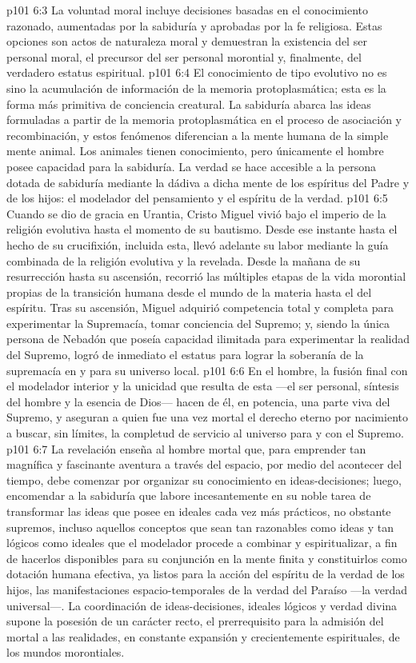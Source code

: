 \vs p101 6:3 \pc La voluntad moral incluye decisiones basadas en el conocimiento razonado, aumentadas por la sabiduría y aprobadas por la fe religiosa. Estas opciones son actos de naturaleza moral y demuestran la existencia del ser personal moral, el precursor del ser personal morontial y, finalmente, del verdadero estatus espiritual.
\vs p101 6:4 El conocimiento de tipo evolutivo no es sino la acumulación de información de la memoria protoplasmática; esta es la forma más primitiva de conciencia creatural. La sabiduría abarca las ideas formuladas a partir de la memoria protoplasmática en el proceso de asociación y recombinación, y estos fenómenos diferencian a la mente humana de la simple mente animal. Los animales tienen conocimiento, pero únicamente el hombre posee capacidad para la sabiduría. La verdad se hace accesible a la persona dotada de sabiduría mediante la dádiva a dicha mente de los espíritus del Padre y de los hijos: el modelador del pensamiento y el espíritu de la verdad.
\vs p101 6:5 \pc Cuando se dio de gracia en Urantia, Cristo Miguel vivió bajo el imperio de la religión evolutiva hasta el momento de su bautismo. Desde ese instante hasta el hecho de su crucifixión, incluida esta, llevó adelante su labor mediante la guía combinada de la religión evolutiva y la revelada. Desde la mañana de su resurrección hasta su ascensión, recorrió las múltiples etapas de la vida morontial propias de la transición humana desde el mundo de la materia hasta el del espíritu. Tras su ascensión, Miguel adquirió competencia total y completa para experimentar la Supremacía, tomar conciencia del Supremo; y, siendo la única persona de Nebadón que poseía capacidad ilimitada para experimentar la realidad del Supremo, logró de inmediato el estatus para lograr la soberanía de la supremacía en y para su universo local.
\vs p101 6:6 En el hombre, la fusión final con el modelador interior y la unicidad que resulta de esta ---el ser personal, síntesis del hombre y la esencia de Dios--- hacen de él, en potencia, una parte viva del Supremo, y aseguran a quien fue una vez mortal el derecho eterno por nacimiento a buscar, sin límites, la completud de servicio al universo para y con el Supremo.
\vs p101 6:7 \pc La revelación enseña al hombre mortal que, para emprender tan magnífica y fascinante aventura a través del espacio, por medio del acontecer del tiempo, debe comenzar por organizar su conocimiento en ideas\hyp{}decisiones; luego, encomendar a la sabiduría que labore incesantemente en su noble tarea de transformar las ideas que posee en ideales cada vez más prácticos, no obstante supremos, incluso aquellos conceptos que sean tan razonables como ideas y tan lógicos como ideales que el modelador procede a combinar y espiritualizar, a fin de hacerlos disponibles para su conjunción en la mente finita y constituirlos como dotación humana efectiva, ya listos para la acción del espíritu de la verdad de los hijos, las manifestaciones espacio\hyp{}temporales de la verdad del Paraíso ---la verdad universal---. La coordinación de ideas\hyp{}decisiones, ideales lógicos y verdad divina supone la posesión de un carácter recto, el prerrequisito para la admisión del mortal a las realidades, en constante expansión y crecientemente espirituales, de los mundos morontiales.
